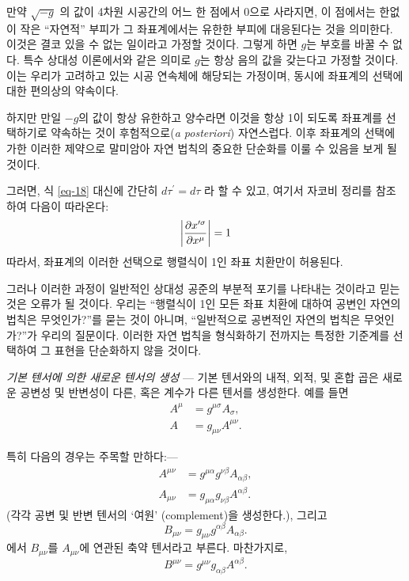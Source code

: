 \documentclass[b5paper]{article}
\begin{document}
만약 $\sqrt{-g}$ 의 값이 4차원 시공간의 어느 한 점에서 $0$으로 사라지면, 이 점에서는 한없이 작은 ``자연적'' 부피가 그 좌표계에서는 유한한 부피에 대응된다는 것을 의미한다. 이것은 결코 있을 수 없는 일이라고 가정할 것이다. 그렇게 하면 $g$는 부호를 바꿀 수 없다. 특수 상대성 이론에서와 같은 의미로  $g$는 항상 음의 값을 갖는다고 가정할 것이다. 이는 우리가 고려하고 있는 시공 연속체에 해당되는 가정이며, 동시에 좌표계의 선택에 대한 편의상의 약속이다.

하지만 만일 $-g$의 값이 항상 유한하고 양수라면 이것을 항상 1이 되도록 좌표계를 선택하기로 약속하는 것이 후험적으로(\emph{a posteriori}) 자연스럽다. 이후 좌표계의 선택에 가한 이러한 제약으로 말미암아 자연 법칙의 중요한 단순화를 이룰 수 있음을 보게 될 것이다.

그러면, 식 \eqref{eq-18} 대신에 간단히 $d\tau^\prime = d\tau$ 라 할 수 있고, 여기서 자코비 정리를 참조하여 다음이 따라온다:
\begin{equation} \label{eq-19}
\left|{\frac{{\partial}{x^{\prime\sigma}}}{{\partial}{x^\mu}}}\right|=1
\end{equation}  
따라서, 좌표계의 이러한 선택으로 행렬식이 1인 좌표 치환만이 허용된다.

그러나 이러한 과정이 일반적인 상대성 공준의 부분적 포기를 나타내는 것이라고 믿는 것은 오류가 될 것이다. 우리는 ``행렬식이 1인 모든 좌표 치환에 대하여 공변인 자연의 법칙은 무엇인가?''를 묻는 것이 아니며, ``일반적으로 공변적인 자연의 법칙은 무엇인가?''가 우리의 질문이다. 이러한 자연 법칙을 형식화하기 전까지는 특정한 기준계를 선택하여 그 표현을 단순화하지 않을 것이다. 

\emph{기본 텐서에 의한 새로운 텐서의 생성} ---
기본 텐서와의 내적, 외적, 및 혼합 곱은 새로운 공변성 및 반변성이 다른, 혹은 계수가 다른 텐서를 생성한다. 예를 들면
\begin{align*}
	A^\mu &= g^{\mu\sigma} A_\sigma, \\
	A &= g_{\mu\nu} A^{\mu\nu}.
\end{align*}

특히 다음의 경우는 주목할 만하다:---
\begin{align*}
A^{\mu\nu} &= g^{\mu\alpha} g^{\nu\beta} A_{\alpha\beta}, \\
A_{\mu\nu} &= g_{\mu\alpha} g_{\nu\beta} A^{\alpha\beta}.
\end{align*}
(각각 공변 및 반변 텐서의 `여원' (complement)을 생성한다.), 그리고
\begin{equation*}
	B_{\mu\nu} = g_{\mu\nu} g^{\alpha\beta} A_{\alpha\beta}.
\end{equation*}
에서 $B_{\mu\nu}$를 $A_{\mu\nu}$에 연관된 축약 텐서라고 부른다. 마찬가지로,
\begin{equation*}
	B^{\mu\nu} = g^{\mu\nu} g_{\alpha\beta} A^{\alpha\beta}.
\end{equation*}
\end{document}
